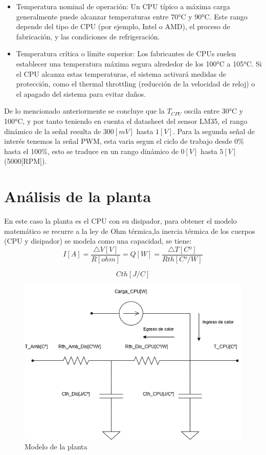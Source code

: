 \documentclass[12pt]{article}
\begin{document}
	\begin{itemize}
		\item Temperatura nominal de operación: Un CPU típico a máxima carga generalmente puede alcanzar temperaturas entre 70°C y 90°C. Este rango depende del tipo de CPU (por ejemplo, Intel o AMD), el proceso de fabricación, y las condiciones de refrigeración.
		\item Temperatura crítica o límite superior: Los fabricantes de CPUs suelen establecer una temperatura máxima segura alrededor de los 100°C a 105°C. Si el CPU alcanza estas temperaturas, el sistema activará medidas de protección, como el thermal throttling (reducción de la velocidad de reloj) o el apagado del sistema para evitar daños.
	\end{itemize}
	
	De lo mencionado anteriormente se concluye que la $T_{CPU}$ oscila entre 30°C  y 100°C, y por tanto teniendo en cuenta el datasheet del sensor LM35, el rango dinámico de la señal resulta de $300[mV]$ hasta $1[V]$.
	Para la segunda señal de interés tenemos la señal PWM, esta varia segun el ciclo de trabajo desde 0\% hasta el 100\%, esto se traduce en un rango dinámico de $0[V]$ hasta $5[V]$(5000[RPM]).
	 
\section{Análisis de la planta}
	 En este caso la planta es el CPU con su  disipador, para obtener el modelo matemático se recurre a la ley de Ohm térmica,la inercia térmica de los cuerpos (CPU y disipador) se modela como una capacidad, se tiene:
	 \begin{equation}
	 	I[A]=\frac{\bigtriangleup V[V]}{R[ohm]}=Q[W]=\frac{\bigtriangleup T[Cº]}{Rth[Cº/W]}
	 \end{equation}
	 
	 \begin{equation}
	 	Cth[J/C]
	 \end{equation}\newpage
	 
	 \begin{figure}[h!]
	 	\centering
	 	\includegraphics[width=0.7\linewidth]{Imagenes/Modelo_planta}
	 	\caption[Modelo de la planta]{Modelo de la planta}
	 	\label{fig:modeloplanta}
	 \end{figure}
	 
\end{document}
